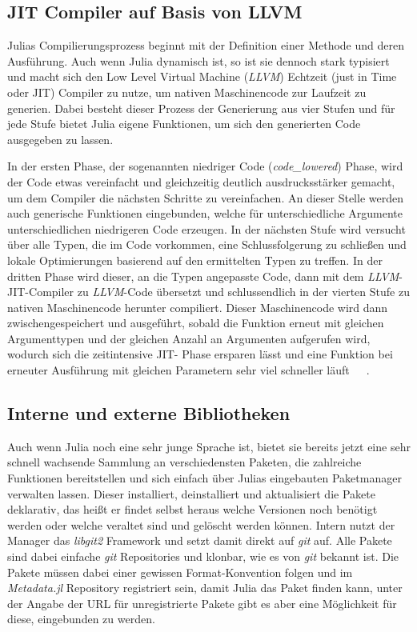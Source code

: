 \documentclass[proseminar,german,utf8]{zihpub}
\begin{document}
\subsection{JIT Compiler auf Basis von LLVM}

Julias Compilierungsprozess beginnt mit der Definition einer Methode und deren Ausführung. Auch wenn Julia dynamisch ist, so ist sie dennoch stark typisiert und macht sich den Low Level Virtual Machine (\textit{LLVM}) Echtzeit (just in Time oder JIT) Compiler zu nutze, um nativen Maschinencode zur Laufzeit zu generien. Dabei besteht dieser Prozess der Generierung aus vier Stufen und für jede Stufe bietet Julia eigene Funktionen, um sich den generierten Code ausgegeben zu lassen.

In der ersten Phase, der sogenannten niedriger Code (\textit{code\_lowered}) Phase, wird der Code etwas vereinfacht und gleichzeitig deutlich ausdrucksstärker gemacht, um dem Compiler die nächsten Schritte zu vereinfachen. An dieser Stelle werden auch generische Funktionen eingebunden, welche für unterschiedliche Argumente unterschiedlichen niedrigeren Code erzeugen. In der nächsten Stufe wird versucht über alle Typen, die im Code vorkommen, eine Schlussfolgerung zu schließen und lokale Optimierungen basierend auf den ermittelten Typen zu treffen. In der dritten Phase wird dieser, an die Typen angepasste Code, dann mit dem \textit{LLVM}-JIT-Compiler zu \textit{LLVM}-Code übersetzt  und schlussendlich in der vierten Stufe zu nativen Maschinencode herunter compiliert. Dieser Maschinencode wird dann zwischengespeichert und ausgeführt, sobald die Funktion erneut mit gleichen Argumenttypen und der gleichen Anzahl an Argumenten aufgerufen wird, wodurch sich die zeitintensive JIT- Phase ersparen lässt und eine Funktion bei erneuter Ausführung mit gleichen Parametern sehr viel schneller läuft~\cite{JuliaLangDocumentation}~\cite{CompilerYoutube}~\cite{StaticJuliaComputing}.

\subsection{Interne und externe Bibliotheken}

Auch wenn Julia noch eine sehr junge Sprache ist, bietet sie bereits jetzt eine sehr schnell wachsende Sammlung an verschiedensten Paketen, die zahlreiche Funktionen bereitstellen und sich einfach über Julias eingebauten Paketmanager verwalten lassen. Dieser installiert, deinstalliert und aktualisiert die Pakete deklarativ, das heißt er findet selbst heraus welche Versionen noch benötigt werden oder welche veraltet sind und gelöscht werden können. Intern nutzt der Manager das \textit{libgit2} Framework und setzt damit direkt auf \textit{git} auf. Alle Pakete sind dabei einfache \textit{git} Repositories und klonbar, wie es von \textit{git} bekannt ist. Die Pakete müssen dabei einer gewissen Format-Konvention folgen und im \textit{Metadata.jl} Repository registriert sein, damit Julia das Paket finden kann, unter der Angabe der URL für unregistrierte Pakete gibt es aber eine Möglichkeit für diese, eingebunden zu werden. 
\end{document}
